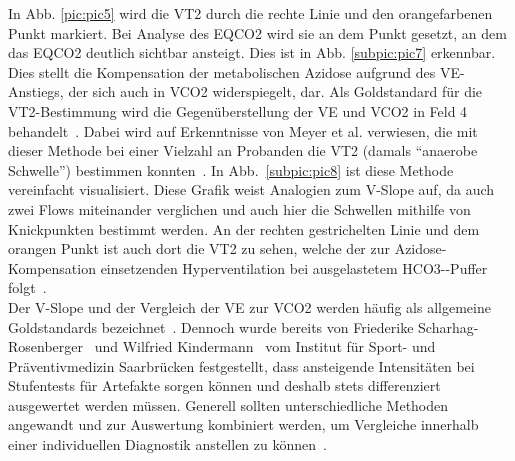 %
In Abb. \ref{pic:pic5} wird die VT2 durch die rechte Linie und den orangefarbenen Punkt markiert. Bei Analyse des \gls{EQCO2} wird sie an dem Punkt gesetzt, an dem das \gls{EQCO2} deutlich sichtbar ansteigt. Dies ist in Abb. \ref{subpic:pic7} erkennbar. Dies stellt die Kompensation der metabolischen Azidose aufgrund des \gls{VE}-Anstiegs, der sich auch in \gls{VCO2} widerspiegelt, dar. Als Goldstandard für die VT2-Bestimmung wird die Gegenüberstellung der \gls{VE} und \gls{VCO2} in Feld 4 behandelt~\cite{ScharhagRosenberger.2013}. Dabei wird auf Erkenntnisse von Meyer et al. verwiesen, die mit dieser Methode bei einer Vielzahl an Probanden die VT2 (damals "`anaerobe Schwelle"') bestimmen konnten~\cite{Meyer.2005}. In Abb.~\ref{subpic:pic8} ist diese Methode vereinfacht visualisiert. Diese Grafik weist Analogien zum V-Slope auf, da auch zwei Flows miteinander verglichen und auch hier die Schwellen mithilfe von Knickpunkten bestimmt werden. An der rechten gestrichelten Linie und dem orangen Punkt ist auch dort die VT2 zu sehen, welche der zur Azidose-Kompensation einsetzenden Hyperventilation bei ausgelastetem \gls{HCO3-}-Puffer folgt~\cite{ScharhagRosenberger.2010}.\\
Der V-Slope und der Vergleich der \gls{VE} zur \gls{VCO2} werden häufig als allgemeine Goldstandards bezeichnet~\cite{ScharhagRosenberger.2013}. Dennoch wurde bereits von Friederike Scharhag-Rosenberger~\cite{ScharhagRosenberger.2010} und Wilfried Kindermann~\cite{Kindermann.2004} vom Institut für Sport- und Präventivmedizin Saarbrücken festgestellt, dass ansteigende Intensitäten bei Stufentests für Artefakte sorgen können und deshalb stets differenziert ausgewertet werden müssen. Generell sollten unterschiedliche Methoden angewandt und zur Auswertung kombiniert werden, um Vergleiche innerhalb einer individuellen Diagnostik anstellen zu können~\cite{ScharhagRosenberger.2010}.
%
